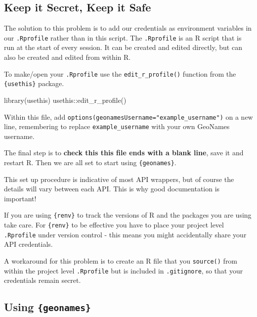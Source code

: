 \documentclass[
  letterpaper,
  DIV=11,
  numbers=noendperiod]{scrreprt}
\newenvironment{Shaded}{\begin{snugshade}}{\end{snugshade}}
\newcommand{\FunctionTok}[1]{\textcolor[rgb]{0.28,0.35,0.67}{#1}}
\newcommand{\NormalTok}[1]{\textcolor[rgb]{0.00,0.23,0.31}{#1}}
\newcommand{\SpecialCharTok}[1]{\textcolor[rgb]{0.37,0.37,0.37}{#1}}
\begin{document}
\subsection{Keep it Secret, Keep it
Safe}\label{keep-it-secret-keep-it-safe}

The solution to this problem is to add our credentials as environment
variables in our \texttt{.Rprofile} rather than in this script. The
\texttt{.Rprofile} is an R script that is run at the start of every
session. It can be created and edited directly, but can also be created
and edited from within R.

To make/open your \texttt{.Rprofile} use the \texttt{edit\_r\_profile()}
function from the \texttt{\{usethis\}} package.

\begin{Shaded}
\begin{Highlighting}[]
\FunctionTok{library}\NormalTok{(usethis)}
\NormalTok{usethis}\SpecialCharTok{::}\FunctionTok{edit\_r\_profile}\NormalTok{()}
\end{Highlighting}
\end{Shaded}

Within this file, add
\texttt{options(geonamesUsername="example\_username")} on a new line,
remembering to replace \texttt{example\_username} with your own GeoNames
username.

The final step is to \textbf{check this this file ends with a blank
line}, save it and restart R. Then we are all set to start using
\texttt{\{geonames\}}.

This set up procedure is indicative of most API wrappers, but of course
the details will vary between each API. This is why good documentation
is important!

If you are using \texttt{\{renv\}} to track the versions of R and the
packages you are using take care. For \texttt{\{renv\}} to be effective
you have to place your project level \texttt{.Rprofile} under version
control - this means you might accidentally share your API credentials.

A workaround for this problem is to create an R file that you
\texttt{source()} from within the project level \texttt{.Rprofile} but
is included in \texttt{.gitignore}, so that your credentials remain
secret.

\subsection{\texorpdfstring{Using
\texttt{\{geonames\}}}{Using \{geonames\}}}\label{using-geonames}
\end{document}
